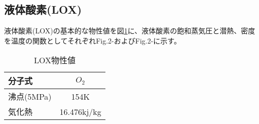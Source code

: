 \subsection{液体酸素(LOX)}
液体酸素(LOX)の基本的な物性値を図\ref{tab:LOX}に、液体酸素の飽和蒸気圧と潜熱、密度を温度の関数としてそれぞれFig.2-およびFig.2-に示す。

\begin{table}[htb]
\begin{center}
\caption{LOX物性値}
\begin{tabular}{|l||c|} \hline
分子式 & $O_{2}$ \\ \hline
沸点(5MPa) & 154K \\ \hline
気化熱 & 16.476kj/kg \\ \hline
\end{tabular}
\label{tab:LOX}
\end{center}
\end{table}

%
